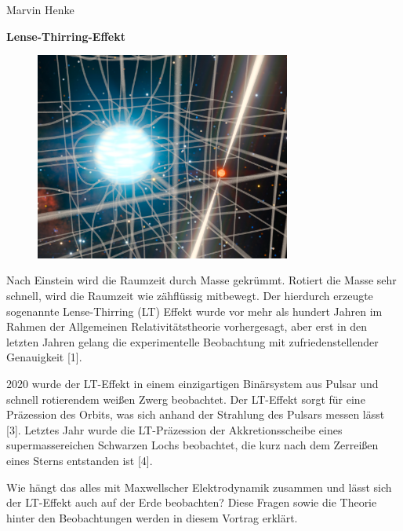 \documentclass[12pt,a4paper]{article}
\begin{document}
	Marvin Henke
	\begin{center}
		\LARGE \textbf{Lense-Thirring-Effekt}
	\end{center}
	
	\begin{figure}[ht]
		\centering
		\includegraphics[width=0.75\textwidth]{../lense_thirring_edited.png}
	\end{figure}
	
	\noindent
	Nach Einstein wird die Raumzeit durch Masse gekrümmt. Rotiert die Masse sehr schnell, wird die Raumzeit wie zähflüssig mitbewegt. Der hierdurch erzeugte sogenannte Lense-Thirring (LT) Effekt wurde vor mehr als hundert Jahren im Rahmen der Allgemeinen Relativitätstheorie vorhergesagt, aber erst in den letzten Jahren gelang die experimentelle Beobachtung mit zufriedenstellender Genauigkeit [1].
	
	2020 wurde der LT-Effekt in einem einzigartigen Binärsystem aus Pulsar und schnell rotierendem weißen Zwerg beobachtet. Der LT-Effekt sorgt für eine Präzession des Orbits, was sich anhand der Strahlung des Pulsars messen lässt [3].
	Letztes Jahr wurde die LT-Präzession der Akkretionsscheibe eines supermassereichen Schwarzen
	Lochs beobachtet, die kurz nach dem Zerreißen eines Sterns entstanden ist [4].
	
	Wie hängt das alles mit Maxwellscher Elektrodynamik zusammen und lässt sich der LT-Effekt auch auf der Erde beobachten? Diese Fragen sowie die Theorie hinter den Beobachtungen werden in diesem Vortrag erklärt.
	
\end{document}
